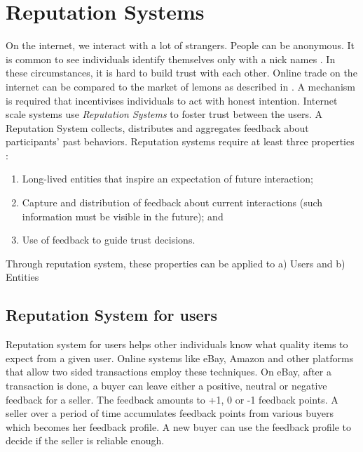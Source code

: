 \section{Reputation Systems}
\label{sec:reputation_systems}

On the internet, we interact with a lot of strangers. People can be anonymous. It is common to see individuals identify themselves only with a nick names \cite{Resnick2000}. In these circumstances, it is hard to build trust with each other. Online trade on the internet can be compared to the market of lemons as described in \cite{Akerlof1970}. A mechanism is required that incentivises individuals to act with honest intention. Internet scale systems use \textit{Reputation Systems} to foster trust between the users. A Reputation System collects, distributes and aggregates feedback about participants' past behaviors. Reputation systems require at least three properties \cite{Resnick2000}:

\begin{enumerate}
  \item Long-lived entities that inspire an expectation of future interaction;
  \item Capture and distribution of feedback about current interactions (such information must be visible in the future); and
  \item Use of feedback to guide trust decisions.
\end{enumerate}

Through reputation system, these properties can be applied to a) Users and b) Entities

\subsection{Reputation System for users}

Reputation system for users helps other individuals know what quality items to expect from a given user. Online systems like eBay, Amazon and other platforms that allow two sided transactions employ these techniques. On eBay, after a transaction is done, a buyer can leave either a positive, neutral or negative feedback for a seller. The feedback amounts to +1, 0 or -1 feedback points. A seller over a period of time accumulates feedback points from various buyers which becomes her feedback profile. A new buyer can use the feedback profile to decide if the seller is reliable enough.

